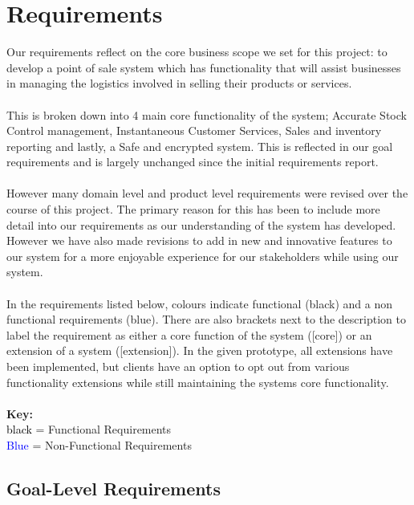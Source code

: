 \documentclass[a4paper]{article}
\begin{document}
\section{Requirements}
Our requirements reflect on the core business scope we set for this project: to develop a point of sale system which has functionality that will assist businesses in managing the logistics
involved in selling their products or services. 
\\\\
This is broken down into 4 main core functionality of the system;  Accurate Stock Control management, Instantaneous Customer Services, Sales and inventory reporting and lastly, a Safe and encrypted system. This is reflected in our goal requirements and is largely unchanged since the initial requirements report. 
\\\\
However many domain level and product level requirements were revised over the course of this project. The primary reason for this has been to include more detail into our requirements as our understanding of the system has developed. However we have also made revisions to add in new and innovative features to our system for a more enjoyable experience for our stakeholders while using our system. 
\\\\
In the requirements listed below, colours indicate functional (black) and a non functional requirements (blue). There are also brackets next to the description to label the requirement as either a core function of the system ([core]) or an extension of a system ([extension]). In the given prototype, all extensions have been implemented, but clients have an option to opt out from various functionality extensions while still maintaining the systems core functionality.
\\\\
\textbf{Key:}\\
\textcolor{black}{black} = Functional Requirements\\
\textcolor{blue} {Blue} = Non-Functional Requirements\\

\subsection{Goal-Level Requirements}

\end{document}
